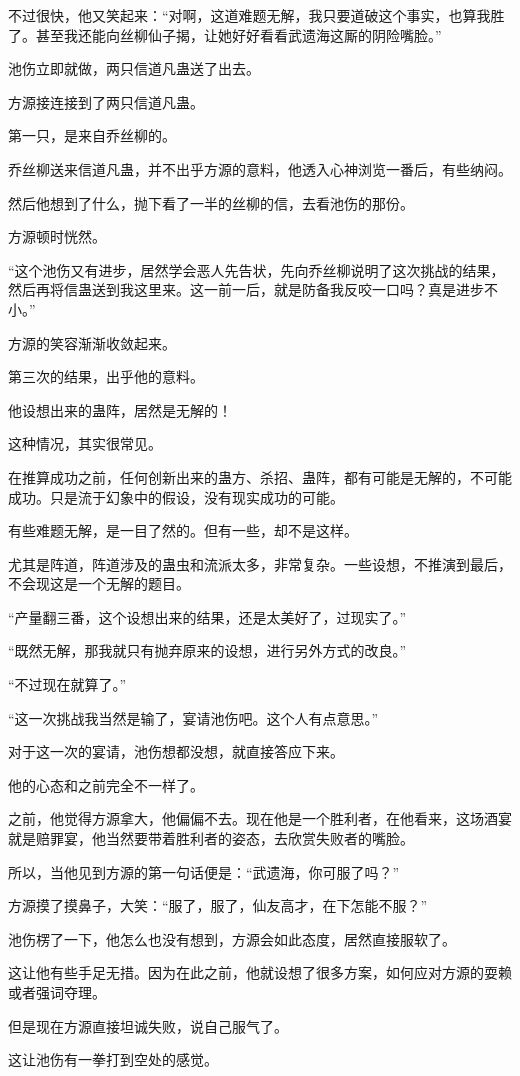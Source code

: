 \begin{this_body}
不过很快，他又笑起来：“对啊，这道难题无解，我只要道破这个事实，也算我胜了。甚至我还能向丝柳仙子揭，让她好好看看武遗海这厮的阴险嘴脸。”

池伤立即就做，两只信道凡蛊送了出去。

方源接连接到了两只信道凡蛊。

第一只，是来自乔丝柳的。

乔丝柳送来信道凡蛊，并不出乎方源的意料，他透入心神浏览一番后，有些纳闷。

然后他想到了什么，抛下看了一半的丝柳的信，去看池伤的那份。

方源顿时恍然。

“这个池伤又有进步，居然学会恶人先告状，先向乔丝柳说明了这次挑战的结果，然后再将信蛊送到我这里来。这一前一后，就是防备我反咬一口吗？真是进步不小。”

方源的笑容渐渐收敛起来。

第三次的结果，出乎他的意料。

他设想出来的蛊阵，居然是无解的！

这种情况，其实很常见。

在推算成功之前，任何创新出来的蛊方、杀招、蛊阵，都有可能是无解的，不可能成功。只是流于幻象中的假设，没有现实成功的可能。

有些难题无解，是一目了然的。但有一些，却不是这样。

尤其是阵道，阵道涉及的蛊虫和流派太多，非常复杂。一些设想，不推演到最后，不会现这是一个无解的题目。

“产量翻三番，这个设想出来的结果，还是太美好了，过现实了。”

“既然无解，那我就只有抛弃原来的设想，进行另外方式的改良。”

“不过现在就算了。”

“这一次挑战我当然是输了，宴请池伤吧。这个人有点意思。”

对于这一次的宴请，池伤想都没想，就直接答应下来。

他的心态和之前完全不一样了。

之前，他觉得方源拿大，他偏偏不去。现在他是一个胜利者，在他看来，这场酒宴就是赔罪宴，他当然要带着胜利者的姿态，去欣赏失败者的嘴脸。

所以，当他见到方源的第一句话便是：“武遗海，你可服了吗？”

方源摸了摸鼻子，大笑：“服了，服了，仙友高才，在下怎能不服？”

池伤楞了一下，他怎么也没有想到，方源会如此态度，居然直接服软了。

这让他有些手足无措。因为在此之前，他就设想了很多方案，如何应对方源的耍赖或者强词夺理。

但是现在方源直接坦诚失败，说自己服气了。

这让池伤有一拳打到空处的感觉。

\end{this_body}

